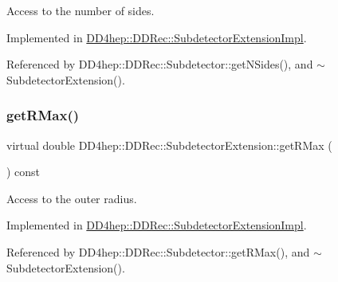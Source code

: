 Access to the number of sides. 



Implemented in \hyperlink{class_d_d4hep_1_1_d_d_rec_1_1_subdetector_extension_impl_a1f9b794b782aef4c2da0d1399d4e001b}{D\+D4hep\+::\+D\+D\+Rec\+::\+Subdetector\+Extension\+Impl}.



Referenced by D\+D4hep\+::\+D\+D\+Rec\+::\+Subdetector\+::get\+N\+Sides(), and $\sim$\+Subdetector\+Extension().

\hypertarget{class_d_d4hep_1_1_d_d_rec_1_1_subdetector_extension_a6d7b6e1818a7ca5054279ea5d372b7f4}{}\label{class_d_d4hep_1_1_d_d_rec_1_1_subdetector_extension_a6d7b6e1818a7ca5054279ea5d372b7f4} 
\subsubsection{\texorpdfstring{get\+R\+Max()}{getRMax()}}
{\footnotesize\ttfamily virtual double D\+D4hep\+::\+D\+D\+Rec\+::\+Subdetector\+Extension\+::get\+R\+Max (\begin{DoxyParamCaption}{ }\end{DoxyParamCaption}) const\hspace{0.3cm}{\ttfamily [pure virtual]}}



Access to the outer radius. 



Implemented in \hyperlink{class_d_d4hep_1_1_d_d_rec_1_1_subdetector_extension_impl_a15bfbc17be22ce16a2f795c06c4ab571}{D\+D4hep\+::\+D\+D\+Rec\+::\+Subdetector\+Extension\+Impl}.



Referenced by D\+D4hep\+::\+D\+D\+Rec\+::\+Subdetector\+::get\+R\+Max(), and $\sim$\+Subdetector\+Extension().

\hypertarget{class_d_d4hep_1_1_d_d_rec_1_1_subdetector_extension_a2de40b96e752aee9d68559657c8b7874}{}\label{class_d_d4hep_1_1_d_d_rec_1_1_subdetector_extension_a2de40b96e752aee9d68559657c8b7874} 
